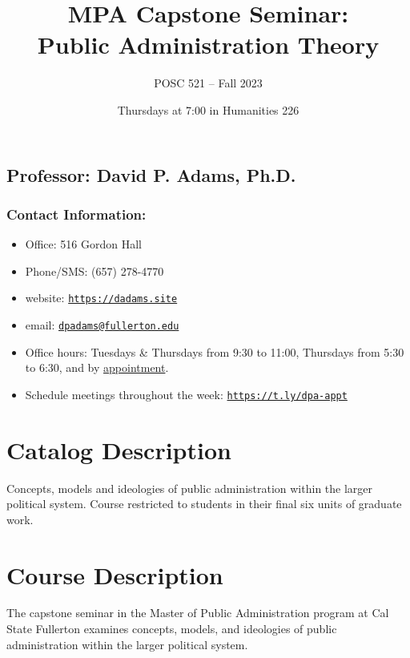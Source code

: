 \documentclass[12pt, letterpaper]{article}
\begin{document}
\title{MPA Capstone Seminar: \\ Public Administration Theory}

\author{POSC 521 -- Fall 2023}
\date{Thursdays at 7:00 in Humanities 226}

    \maketitle


\subsection*{Professor: David P. Adams, Ph.D.}

\subsubsection*{Contact Information:}

\begin{itemize}
	\item Office: 516 Gordon Hall
	\item Phone/SMS: (657) 278-4770
	\item website: \href{https://dadams.site}{\texttt{https://dadams.site}}
	\item email: \href{dpadams@fullerton.edu}{\texttt{dpadams@fullerton.edu}}
	\item Office hours: Tuesdays \& Thursdays from 9:30 to 11:00, Thursdays from 5:30 to 6:30, and by \href{https://t.ly/dpa-appt}{appointment}.
	\item Schedule meetings throughout the week: \href{https://t.ly/dpa-appt}{\texttt{https://t.ly/dpa-appt}}
\end{itemize}

\section{Catalog Description}
Concepts, models and ideologies of public administration within the larger political system. Course restricted to students in their final six units of graduate work.

\section{Course Description}
The capstone seminar in the Master of Public Administration program at Cal State Fullerton examines concepts, models, and ideologies of public administration within the larger political system.
\end{document}
